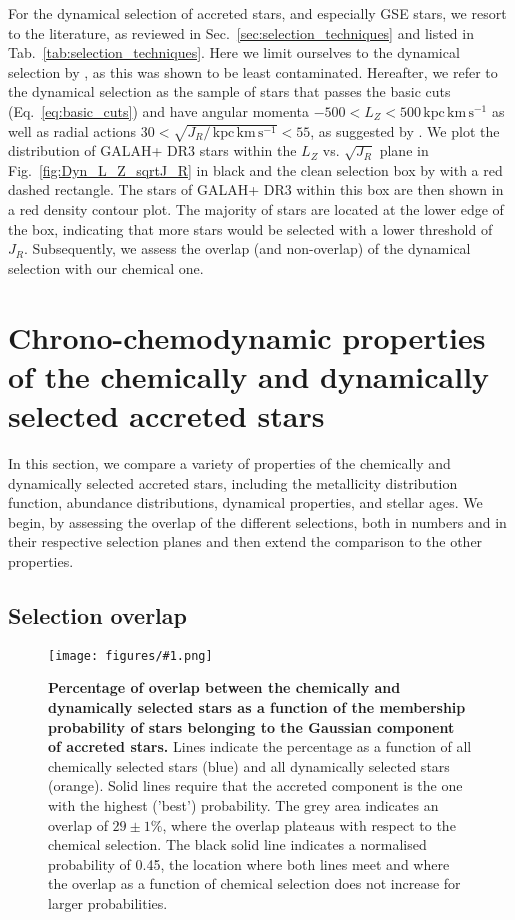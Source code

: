 \documentclass[fleqn,usenatbib]{mnras}
\newcommand{\kpckms}{\,\mathrm{kpc\,km\,s^{-1}}}	%
\newcommand{\codeicon}{{\faCloudDownload}}
\newcommand{\codelink}[1]{\href{https://github.com/svenbuder/buder_galah_accreted_chemistry/tree/main/figures/#1.ipynb}{\codeicon}\,\,}
\newcommand{\oscaption}[2]{\caption{#2 \codelink{#1}}}
\newcommand{\figurecolumnwidth}[3]{\begin{figure} \centering \texttt{[image: figures/\#1.png]}\oscaption{#2}{#3}\label{fig:#1} \end{figure}}
\begin{document}
For the dynamical selection of accreted stars, and especially GSE stars, we resort to the literature, as reviewed in Sec.~\ref{sec:selection_techniques} and listed in Tab.~\ref{tab:selection_techniques}. Here we limit ourselves to the dynamical selection by \citet{Feuillet2021}, as this was shown to be least contaminated. Hereafter, we refer to the dynamical selection as the sample of stars that passes the basic cuts (Eq.~\ref{eq:basic_cuts}) and have angular momenta $-500 < L_Z < 500 \kpckms$ as well as radial actions $30 < \sqrt{J_R / \kpckms} < 55$, as suggested by \citet{Feuillet2021}. We plot the distribution of GALAH+ DR3 stars within the $L_Z$ vs. $\sqrt{J_R}$ plane in Fig.~\ref{fig:Dyn_L_Z_sqrtJ_R} in black and the clean selection box by \citet{Feuillet2021} with a red dashed rectangle. The stars of GALAH+ DR3 within this box are then shown in a red density contour plot. The majority of stars are located at the lower edge of the box, indicating that more stars would be selected with a lower threshold of $J_R$. Subsequently, we assess the overlap (and non-overlap) of the dynamical selection with our chemical one.

\section{Chrono-chemodynamic properties of the chemically and dynamically selected accreted stars} \label{sec:chronochemodynamics}

In this section, we compare a variety of properties of the chemically and dynamically selected accreted stars, including the metallicity distribution function, abundance distributions, dynamical properties, and stellar ages. We begin, by assessing the overlap of the different selections, both in numbers and in their respective selection planes and then extend the comparison to the other properties.

\subsection{Selection overlap} \label{sec:overlap_planes}

\figurecolumnwidth{quantitative_overlap_chemdyn}{chronochemodynamic_comparison}{
\textbf{Percentage of overlap between the chemically and dynamically selected stars as a function of the membership probability of stars belonging to the Gaussian component of accreted stars.} Lines indicate the percentage as a function of all chemically selected stars (blue) and all dynamically selected stars (orange). Solid lines require that the accreted component is the one with the highest ('best') probability. The grey area indicates an overlap of $29\pm1\%$, where the overlap plateaus with respect to the chemical selection. The black solid line indicates a normalised probability of 0.45, the location where both lines meet and where the overlap as a function of chemical selection does not increase for larger probabilities.
}
\end{document}
